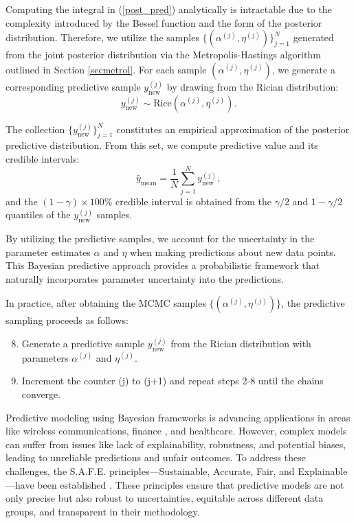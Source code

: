 \documentclass[12pt]{interact}
\theoremstyle{plain}%
\theoremstyle{definition}
\theoremstyle{remark}
\begin{document}
Computing the integral in (\ref{post_pred}) analytically is intractable due to the complexity introduced by the Bessel function and the form of the posterior distribution. Therefore, we utilize the samples \(\{ (\alpha^{(j)}, \eta^{(j)}) \}_{j=1}^{N}\) generated from the joint posterior distribution via the Metropolis-Hastings algorithm outlined in Section \ref{secmetrol}. For each sample \((\alpha^{(j)}, \eta^{(j)})\), we generate a corresponding predictive sample \(y_{\text{new}}^{(j)}\) by drawing from the Rician distribution:
\begin{equation}\label{predictive_sample}
y_{\text{new}}^{(j)} \sim \text{Rice}(\alpha^{(j)}, \eta^{(j)}).
\end{equation}

The collection \(\{ y_{\text{new}}^{(j)} \}_{j=1}^{N}\) constitutes an empirical approximation of the posterior predictive distribution. From this set, we compute predictive value and its credible intervals:
\begin{equation}\label{predictive_mean}
\hat{y}_{\text{mean}} = \frac{1}{N} \sum_{j=1}^{N} y_{\text{new}}^{(j)},
\end{equation}
and the \((1 - \gamma)\times100\%\) credible interval is obtained from the \(\gamma/2\) and \(1 - \gamma/2\) quantiles of the \(y_{\text{new}}^{(j)}\) samples.

By utilizing the predictive samples, we account for the uncertainty in the parameter estimates \(\alpha\) and \(\eta\) when making predictions about new data points. This Bayesian predictive approach provides a probabilistic framework that naturally incorporates parameter uncertainty into the predictions.

In practice, after obtaining the MCMC samples \(\{ (\alpha^{(j)}, \eta^{(j)}) \}\), the predictive sampling proceeds as follows:

\begin{enumerate}
    \setcounter{enumi}{7}
    
    \item Generate a predictive sample \( y_{\text{new}}^{(j)} \) from the Rician distribution with parameters \(\alpha^{(j)}\) and \(\eta^{(j)}\).
    \item  Increment the counter (j) to (j+1) and repeat steps 2-8 until the chains converge.
\end{enumerate}



Predictive modeling using Bayesian frameworks is advancing applications in areas like wireless communications, finance \cite{giudici2023safe}, and healthcare. However, complex models can suffer from issues like lack of explainability, robustness, and potential biases, leading to unreliable predictions and unfair outcomes. To address these challenges, the S.A.F.E. principles—Sustainable, Accurate, Fair, and Explainable—have been established \cite{giudici2024safe}. These principles ensure that predictive models are not only precise but also robust to uncertainties, equitable across different data groups, and transparent in their methodology.
\end{document}
